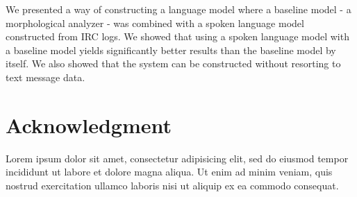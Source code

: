 \documentclass[a4paper,conference]{IEEEtran}
\begin{document}
We presented a way of constructing a language model where a baseline
model - a morphological analyzer - was combined with a spoken language
model constructed from IRC logs. We showed that using a spoken
language model with a baseline model yields significantly better
results than the baseline model by itself. We also showed that the
system can be constructed without resorting to text message data.

\section*{Acknowledgment}

Lorem ipsum dolor sit amet, consectetur adipisicing elit, sed do eiusmod tempor incididunt ut labore et dolore magna aliqua. Ut enim ad minim veniam, quis nostrud exercitation ullamco laboris nisi ut aliquip ex ea commodo consequat.

\






\end{document}

